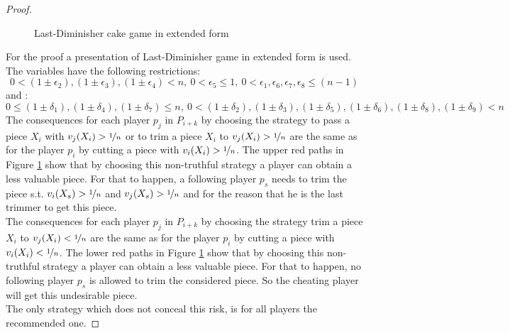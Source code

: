 \begin{proof}
\begin{figure}[h!]
\begin{center}
\begin{tikzpicture}
	\end{tikzpicture}
	\caption{Last-Diminisher cake game in extended form}\label{ldef}
\end{center}
\end{figure}
\newpage 
For the proof a presentation of Last-Diminisher game in extended form is used. The variables have the following restrictions: $$ 0 < (1\pm\epsilon_2),(1\pm\epsilon_3),(1\pm\epsilon_4) <n,\: 0 < \epsilon_5 \leq 1,\:0 < \epsilon_1,\epsilon_6,\epsilon_7,\epsilon_8 \leq (n-1)$$ and :$$ 0 \leq (1\pm\delta_1),(1\pm\delta_4),(1\pm\delta_7) \leq n,\:0< (1\pm\delta_2),(1\pm\delta_3),(1\pm\delta_5),(1\pm\delta_6),(1\pm\delta_8),(1\pm\delta_9) < n$$
The consequences for each player $p_j$ in $P_{i+k}$ by choosing the strategy to pass a piece $X_i$ with $v_j(X_i)>\nicefrac{1}{n}$ or to trim a piece $X_i$ to $v_j(X_i)>\nicefrac{1}{n}$ are the same as for the player $p_i$ by cutting a piece with $v_i(X_i)>\nicefrac{1}{n}$.
The upper red paths in Figure \ref{ldef} show that by choosing this non-truthful strategy a player can obtain a less valuable piece. For that to happen, a following player $p_s$ needs to trim the piece s.t. $v_i(X_s)>\nicefrac{1}{n}$ and $v_j(X_s)>\nicefrac{1}{n}$ and for the reason that he is the last trimmer to get this piece.\\
\newline
The consequences for each player $p_j$ in $P_{i+k}$ by choosing the strategy trim a piece $X_i$ to $v_j(X_i)<\nicefrac{1}{n}$ are the same as for the player $p_i$ by cutting a piece with $v_i(X_i)<\nicefrac{1}{n}$. The lower red paths in Figure \ref{ldef} show that by choosing this non-truthful strategy a player can obtain a less valuable piece. For that to happen, no following player $p_s$ is allowed to trim the considered piece. So the cheating player will get this undesirable piece.
\\
\newline
The only strategy which does not conceal this risk, is for all players the recommended one.
\end{proof}

